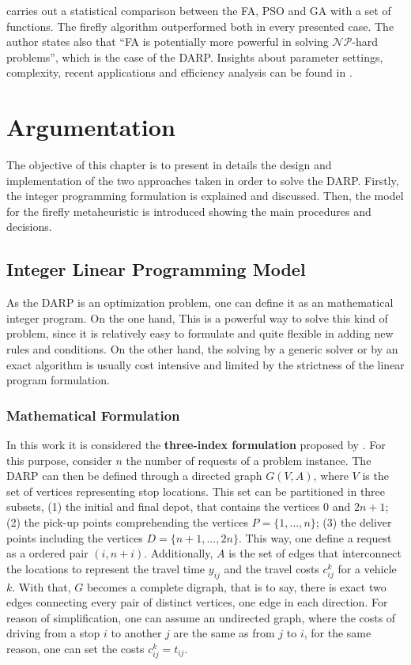 \documentclass[tuberlin,cic,tc,openright,english,noabntcite,oneside]{iiufrgs}
\begin{document}
\textcite[p. 177]{yang_firefly_2009} carries out a statistical comparison between the FA, PSO and GA with a set of functions. The firefly algorithm outperformed both in every presented case. The author states also that \enquote{FA is potentially more powerful in solving $\mathcal{NP}$-hard problems}, which is the case of the DARP. Insights about parameter settings, complexity, recent applications and efficiency analysis can be found in \textcite{yang_firefly_2013}.

\chapter{Argumentation}
The objective of this chapter is to present in details the design and implementation of the two approaches taken in order to solve the DARP. Firstly, the integer programming formulation is explained and discussed. Then, the model for the firefly metaheuristic is introduced showing the main procedures and decisions.

\section{Integer Linear Programming Model}
As the DARP is an optimization problem, one can define it as an mathematical integer program. On the one hand, This is a powerful way to solve this kind of problem, since it is relatively easy to formulate and quite flexible in adding new rules  and conditions. On the other hand, the solving by a generic solver or by an exact algorithm is usually cost intensive and limited by the strictness of the linear program formulation.

\subsection{Mathematical Formulation}
In this work it is considered the \textbf{three-index formulation} proposed by \textcite[p. 574-575]{cordeau_branch-and-cut_2006}. For this purpose, consider $n$ the number of requests of a problem instance. The DARP can then be defined through a directed graph $G(V,A)$, where $V$ is the set of vertices representing stop locations. This set can be partitioned in three subsets, (1) the initial and final depot, that contains the vertices $0$ and $2n+1$; (2) the pick-up points comprehending the vertices $P=\{1,\dotsc,n\}$; (3) the deliver points including the vertices $D=\{n+1,\dotsc,2n\}$. This way, one define a request as a ordered pair $(i,n+i)$. Additionally, $A$ is the set of edges that interconnect the locations to represent the travel time $y_{ij}$ and the travel costs $c_{ij}^{k}$ for a vehicle $k$. With that, $G$ becomes a complete digraph, that is to say, there is exact two edges connecting every pair of distinct vertices, one edge in each direction. For reason of simplification, one can assume an undirected graph, where the costs of driving from a stop $i$ to another $j$ are the same as from $j$ to $i$, for the same reason, one can set the costs $c_{ij}^{k} = t_{ij}$.
\end{document}
